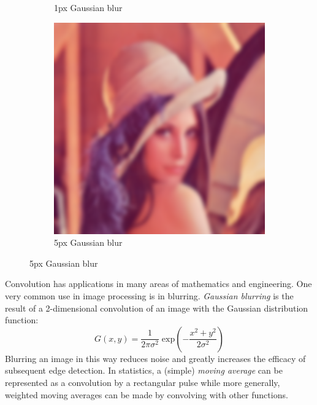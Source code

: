\begin{figure}[ht]
\begin{subfigure}[b]{0.3\textwidth}
                \caption{1px Gaussian blur}
       \end{subfigure}
       \begin{subfigure}[b]{0.3\textwidth}
                \includegraphics[scale=0.25]{diagrams/Lenna-blur5}
                \caption{5px Gaussian blur}
       \end{subfigure}
\end{figure}


Convolution has applications in many areas of mathematics and engineering.
One very common use in image processing is in blurring.
\emph{Gaussian blurring} is the result of a 2-dimensional convolution of an image with the Gaussian distribution function:
\begin{equation}
	\label{eqn:2dGaussian}
	G(x,y) = \frac{1}{2 \pi \sigma^2} \; \text{exp} \left( - \frac{x^2 + y^2}{2\sigma^2} \right)
\end{equation}
Blurring an image in this way reduces noise and greatly increases the efficacy of subsequent edge detection.
In statistics, a (simple) \emph{moving average} can be represented as a convolution by a rectangular pulse while more
generally, weighted moving averages can be made by convolving with other functions.





%
%
